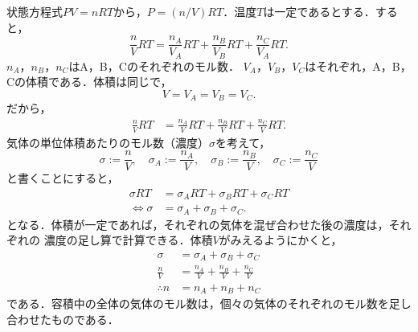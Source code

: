         状態方程式$PV=nRT$から，$P=(n/V)RT$．温度$T$は一定であるとする．すると，
        \[
            \frac{n}{V}RT = \frac{{n}_{A}}{{V}_{A}}RT + \frac{{n}_{B}}{{V}_{B}}RT + \frac{{n}_{C}}{{V}_{A}}RT.
        \]
        ${n}_{A}$，${n}_{B}$，${n}_{C}$はA，B，Cのそれぞれのモル数．
        ${V}_{A}$，${V}_{B}$，${V}_{C}$はそれぞれ，A，B，Cの体積である．体積は同じで，
        \[
            V = {V}_{A} = {V}_{B} = {V}_{C}.
        \]
        だから，
        \begin{align*}
            \frac{n}{V}RT &= \frac{{n}_{A}}{V}RT + \frac{{n}_{B}}{V}RT + \frac{{n}_{C}}{V}RT.
        \end{align*}
        気体の単位体積あたりのモル数（濃度）$\sigma$を考えて，
        \[
            {\sigma}     :=\frac{n}{V},       \quad {\sigma}_{A} :=\frac{{n}_{A}}{V}, \quad
            {\sigma}_{B} :=\frac{{n}_{B}}{V}, \quad {\sigma}_{C} :=\frac{{n}_{C}}{V}
        \]
        と書くことにすると，
        \begin{align*}
                            {\sigma} RT &= {\sigma}_{A} RT + {\sigma}_{B} RT + {\sigma}_{C} RT \\
            \Leftrightarrow {\sigma}    &= {\sigma}_{A}    + {\sigma}_{B}    + {\sigma}_{C}.
        \end{align*}
        となる．体積が一定であれば，それぞれの気体を混ぜ合わせた後の濃度は，それぞれの
        濃度の足し算で計算できる．体積$V$がみえるようにかくと，
        \begin{align*}
                          {\sigma} &= {\sigma}_{A}     + {\sigma}_{B}      + {\sigma}_{C} \\
                       \frac{n}{V} &= \frac{{n}_{A}}{V} + \frac{{n}_{B}}{V} + \frac{{n}_{C}}{V} \\
            \therefore           n &= {n}_{A} + {n}_{B} + {n}_{C}
        \end{align*}
        である．容積中の全体の気体のモル数は，個々の気体のそれぞれのモル数を足し合わせたものである．

